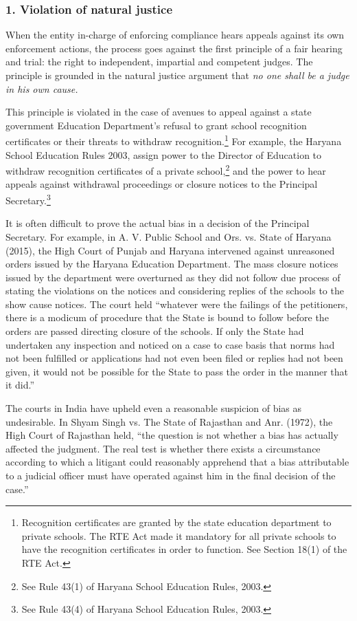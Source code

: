 \documentclass[a4paper, 12pt, twoside]{article}
\begin{document}
\subsubsection*{1. Violation of natural justice}

When the entity in-charge of enforcing compliance hears appeals against its own enforcement actions, the process goes against the first principle of a fair hearing and trial: the right to independent, impartial and competent judges. The principle is grounded in the natural justice argument that \textit{no one shall be a judge in his own cause.}

This principle is violated in the case of avenues to appeal against a state government Education Department’s refusal to grant school recognition certificates or their threats to withdraw recognition.\footnote{Recognition certificates are granted by the state education department to private schools. The RTE Act made it mandatory for all private schools to have the recognition certificates in order to function. See  Section 18(1) of the RTE Act. } For example, the Haryana School Education Rules 2003, assign power to the Director of Education to  withdraw recognition certificates of a private school,\footnote{See Rule 43(1) of Haryana School Education Rules, 2003.} and the power to hear appeals against withdrawal proceedings or closure notices to the Principal Secretary.\footnote{See Rule 43(4) of Haryana School Education Rules, 2003.} 

It is often difficult to prove the actual bias in a decision of the Principal Secretary. For example, in A. V. Public School and Ors. vs. State of Haryana (2015), the High Court of Punjab and Haryana intervened against unreasoned orders issued by the Haryana Education Department. The mass closure notices issued by the department were overturned as they did not follow due process of stating the violations on the notices and considering replies of the schools to the show cause notices. The court held “whatever were the failings of the petitioners, there is a modicum of procedure that the State is bound to follow before the orders are passed directing closure of the schools. If only the State had undertaken any inspection and noticed on a case to case basis that norms had not been fulfilled or applications had not even been filed or replies had not been given, it would not be possible for the State to pass the order in the manner that it did.”

The courts in India have upheld even a reasonable suspicion of bias as undesirable. In Shyam Singh vs. The State of Rajasthan and Anr. (1972), the High Court of Rajasthan held, “the question is not whether a bias has actually affected the judgment. The real test is whether there exists a circumstance according to which a litigant could reasonably apprehend that a bias attributable to a judicial officer must have operated against him in the final decision of the case.”
\end{document}
